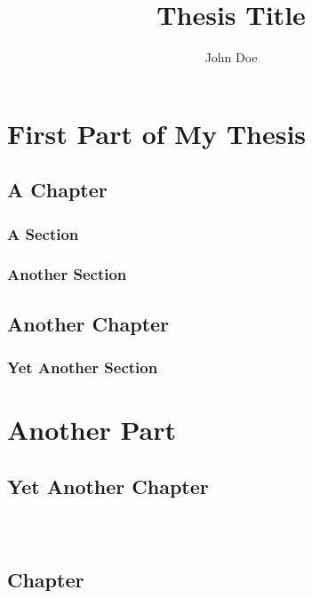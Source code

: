 \documentclass[
  twoside,
  11pt, a4paper,
  footinclude=true,
  headinclude=true,
  cleardoublepage=empty
]{scrbook}
\title{Thesis Title}
\author{John Doe}
\begin{document}
\maketitle







\part{First Part of My Thesis}

\chapter{A Chapter}
\lipsum[1] %

\section{A Section}
\lipsum[1] %

\section{Another Section}
\lipsum[1] %

\chapter{Another Chapter}
\lipsum[1] %

\section{Yet Another Section}
\lipsum[1] %

\part{Another Part}

\chapter{Yet Another Chapter}
\lipsum[1] %
  
\
\part{}
\chapter{ Chapter}
\lipsum[1]
    
\end{document}
